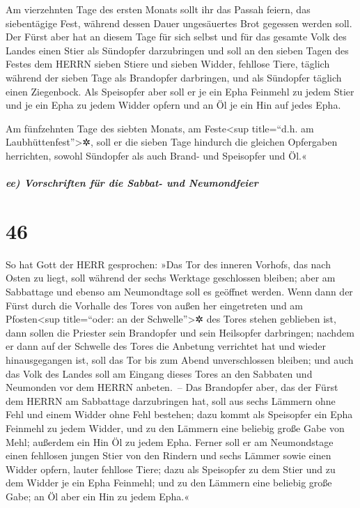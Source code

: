 Am vierzehnten Tage des ersten Monats sollt ihr das
Passah feiern, das siebentägige Fest, während dessen Dauer ungesäuertes
Brot gegessen werden soll. Der Fürst aber hat an diesem
Tage für sich selbst und für das gesamte Volk des Landes einen Stier als
Sündopfer darzubringen und soll an den sieben Tagen des
Festes dem HERRN sieben Stiere und sieben Widder, fehllose Tiere,
täglich während der sieben Tage als Brandopfer darbringen, und als
Sündopfer täglich einen Ziegenbock. Als Speisopfer aber
soll er je ein Epha Feinmehl zu jedem Stier und je ein Epha zu jedem
Widder opfern und an Öl je ein Hin auf jedes Epha.

Am fünfzehnten Tage des siebten Monats, am
Feste\textless sup title=``d.h. am Laubhüttenfest''\textgreater✲, soll
er die sieben Tage hindurch die gleichen Opfergaben herrichten, sowohl
Sündopfer als auch Brand- und Speisopfer und Öl.«

\hypertarget{ee-vorschriften-fuxfcr-die-sabbat--und-neumondfeier}{%
\subparagraph{ee) Vorschriften für die Sabbat- und
Neumondfeier}\label{ee-vorschriften-fuxfcr-die-sabbat--und-neumondfeier}}

\hypertarget{section-45}{%
\section{46}\label{section-45}}

So hat Gott der HERR gesprochen: »Das Tor des inneren
Vorhofs, das nach Osten zu liegt, soll während der sechs Werktage
geschlossen bleiben; aber am Sabbattage und ebenso am Neumondtage soll
es geöffnet werden. Wenn dann der Fürst durch die Vorhalle
des Tores von außen her eingetreten und am Pfosten\textless sup
title=``oder: an der Schwelle''\textgreater✲ des Tores stehen geblieben
ist, dann sollen die Priester sein Brandopfer und sein Heilsopfer
darbringen; nachdem er dann auf der Schwelle des Tores die Anbetung
verrichtet hat und wieder hinausgegangen ist, soll das Tor bis zum Abend
unverschlossen bleiben; und auch das Volk des Landes soll
am Eingang dieses Tores an den Sabbaten und Neumonden vor dem HERRN
anbeten.~-- Das Brandopfer aber, das der Fürst dem HERRN
am Sabbattage darzubringen hat, soll aus sechs Lämmern ohne Fehl und
einem Widder ohne Fehl bestehen; dazu kommt als Speisopfer
ein Epha Feinmehl zu jedem Widder, und zu den Lämmern eine beliebig
große Gabe von Mehl; außerdem ein Hin Öl zu jedem Epha.
Ferner soll er am Neumondstage einen fehllosen jungen
Stier von den Rindern und sechs Lämmer sowie einen Widder opfern, lauter
fehllose Tiere; dazu als Speisopfer zu dem Stier und zu
dem Widder je ein Epha Feinmehl; und zu den Lämmern eine beliebig große
Gabe; an Öl aber ein Hin zu jedem Epha.«

